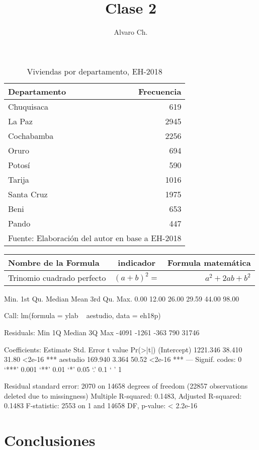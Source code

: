 \documentclass{article}
\title{Clase 2}
\author{Alvaro Ch.}
\begin{document}



\maketitle
\begin{table}[ht]
\caption{Viviendas por departamento, EH-2018}
\centering
\begin{tabular}{lr}
  \hline
Departamento & Frecuencia \\ 
  \hline
    \hline
Chuquisaca & 619 \\ 
\cellcolor{blue}  La Paz & 2945 \\ 
  Cochabamba & 2256 \\ 
  Oruro & 694 \\ 
  Potosí & 590 \\ 
  Tarija & 1016 \\ 
  Santa Cruz & 1975 \\ 
  Beni & 653 \\ 
  Pando & 447 \\ 
   \hline
\multicolumn{2}{l}{Fuente: Elaboración del autor en base a EH-2018}   
\end{tabular}

\end{table}





\begin{tabular}{lcr}
\hline
Nombre de la Formula & indicador & Formula matemática\\
\hline
\hline
Trinomio cuadrado perfecto & $(a+b)^2=$ & $a^2+2ab+b^2$ \\
 \hline

\end{tabular}




\begin{Schunk}
\begin{Soutput}
   Min. 1st Qu.  Median    Mean 3rd Qu.    Max. 
   0.00   12.00   26.00   29.59   44.00   98.00 
\end{Soutput}
\begin{Soutput}
Call:
lm(formula = ylab ~ aestudio, data = eh18p)

Residuals:
   Min     1Q Median     3Q    Max 
 -4091  -1261   -363    790  31746 

Coefficients:
            Estimate Std. Error t value Pr(>|t|)    
(Intercept) 1221.346     38.410   31.80   <2e-16 ***
aestudio     169.940      3.364   50.52   <2e-16 ***
---
Signif. codes:  0 ‘***’ 0.001 ‘**’ 0.01 ‘*’ 0.05 ‘.’ 0.1 ‘ ’ 1

Residual standard error: 2070 on 14658 degrees of freedom
  (22857 observations deleted due to missingness)
Multiple R-squared:  0.1483,	Adjusted R-squared:  0.1483 
F-statistic:  2553 on 1 and 14658 DF,  p-value: < 2.2e-16
\end{Soutput}
\end{Schunk}

\section{Conclusiones}
\end{document}
